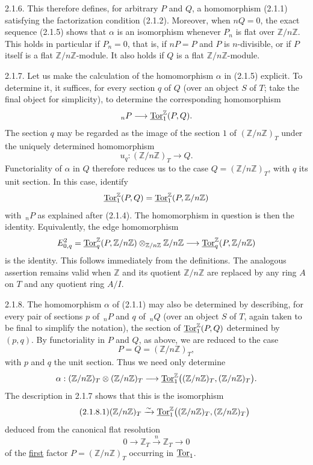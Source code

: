 2.1.6. This therefore defines, for arbitrary $P$ and $Q$, a
homomorphism (2.1.1) satisfying the factorization condition (2.1.2).
Moreover, when $nQ=0$, the exact sequence (2.1.5) shows that $\alpha$
is an isomorphism whenever $P_n$ is flat over
$\mathbb Z/n\mathbb Z$.  This holds in particular if $P_n=0$, that
is, if $nP=P$ and $P$ is $n$-divisible, or if $P$ itself is a flat
$\mathbb Z/n\mathbb Z$-module.  It also holds if $Q$ is a flat
$\mathbb Z/n\mathbb Z$-module.

2.1.7. Let us make the calculation of the homomorphism $\alpha$ in
(2.1.5) explicit.  To determine it, it suffices, for every section
$q$ of $Q$ (over an object $S$ of $T$; take the final object for
simplicity), to determine the corresponding homomorphism
\[
 {}_nP\longrightarrow\uTor^{\mathbb Z}_1(P,Q).
\]
The section $q$ may be regarded as the image of the section $1$ of
$(\mathbb Z/n\mathbb Z)_T$ under the uniquely determined
homomorphism
\[
 u_q:(\mathbb Z/n\mathbb Z)_T\longrightarrow Q.
\]
Functoriality of $\alpha$ in $Q$ therefore reduces us to the case
$Q=(\mathbb Z/n\mathbb Z)_T$, with $q$ its unit section.  In this
case, identify
\[
 \uTor^{\mathbb Z}_1(P,Q)
 =
 \uTor^{\mathbb Z}_1(P,\mathbb Z/n\mathbb Z)
\]
with $\,{}_nP$ as explained after (2.1.4).  The homomorphism in question
is then the identity.  Equivalently, the edge homomorphism
\[
 E^2_{0,q}
 =
 \uTor^{\mathbb Z}_q(P,\mathbb Z/n\mathbb Z)
 \otimes_{\mathbb Z/n\mathbb Z}\mathbb Z/n\mathbb Z
 \longrightarrow
 \uTor^{\mathbb Z}_q(P,\mathbb Z/n\mathbb Z)
\]
is the identity.  This follows immediately from the definitions.
The analogous assertion remains valid when $\mathbb Z$ and its
quotient $\mathbb Z/n\mathbb Z$ are replaced by any ring $A$ on $T$
and any quotient ring $A/I$.

2.1.8. The homomorphism $\alpha$ of (2.1.1) may also be determined by
describing, for every pair of sections $p$ of $\,{}_nP$ and $q$ of
$\,{}_nQ$ (over an object $S$ of $T$, again taken to be final to
simplify the notation), the section of
$\uTor^{\mathbb Z}_1(P,Q)$ determined by $(p,q)$.  By functoriality in
$P$ and $Q$, as above, we are reduced to the case
\[
 P=Q=(\mathbb Z/n\mathbb Z)_T,
\]
with $p$ and $q$ the unit section.  Thus we need only determine
\[
 \alpha:
 (\mathbb Z/n\mathbb Z)_T\otimes(\mathbb Z/n\mathbb Z)_T
 \longrightarrow
 \uTor^{\mathbb Z}_1
 \bigl((\mathbb Z/n\mathbb Z)_T,(\mathbb Z/n\mathbb Z)_T\bigr).
\]
The description in 2.1.7 shows that this is the isomorphism
\begin{equation}\tag{2.1.8.1}
 (\mathbb Z/n\mathbb Z)_T
 \xrightarrow{\sim}
 \uTor^{\mathbb Z}_1
 \bigl((\mathbb Z/n\mathbb Z)_T,(\mathbb Z/n\mathbb Z)_T\bigr)
\end{equation}
deduced from the canonical flat resolution
\begin{equation}\tag{2.1.8.2}
 0\longrightarrow\mathbb Z_T
 \xrightarrow{n}\mathbb Z_T
 \longrightarrow0
\end{equation}
of the \underline{first} factor
$P=(\mathbb Z/n\mathbb Z)_T$ occurring in $\uTor_1$.
